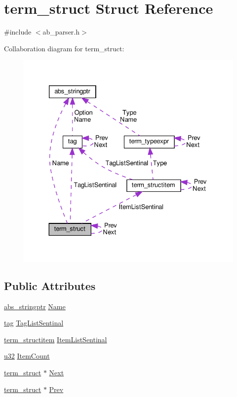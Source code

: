 \hypertarget{structterm__struct}{}\section{term\+\_\+struct Struct Reference}
\label{structterm__struct}


{\ttfamily \#include $<$ab\+\_\+parser.\+h$>$}



Collaboration diagram for term\+\_\+struct\+:\nopagebreak
\begin{figure}[H]
\begin{center}
\leavevmode
\includegraphics[width=330pt]{df/d72/structterm__struct__coll__graph}
\end{center}
\end{figure}
\subsection*{Public Attributes}
\begin{DoxyCompactItemize}
\item 
\hyperlink{structabs__stringptr}{abs\+\_\+stringptr} \hyperlink{structterm__struct_a89d9cb121c9adf97d79fe1a2304c672a}{Name}
\item 
\hyperlink{structtag}{tag} \hyperlink{structterm__struct_a95c474434ab1c1d7e1ac66df37592d68}{Tag\+List\+Sentinal}
\item 
\hyperlink{structterm__structitem}{term\+\_\+structitem} \hyperlink{structterm__struct_a0983a4cdc7024100a2f870b0d484a99d}{Item\+List\+Sentinal}
\item 
\hyperlink{ab__common_8h_afaa62991928fb9fb18ff0db62a040aba}{u32} \hyperlink{structterm__struct_a7346270cfcb97d2aba636aaccf0a35be}{Item\+Count}
\item 
\hyperlink{structterm__struct}{term\+\_\+struct} $\ast$ \hyperlink{structterm__struct_a733a9fd60e2c6d6dd108fe88e18a8cb8}{Next}
\item 
\hyperlink{structterm__struct}{term\+\_\+struct} $\ast$ \hyperlink{structterm__struct_aa5cc89c03d6af0b5a43680485f5224cb}{Prev}
\end{DoxyCompactItemize}


